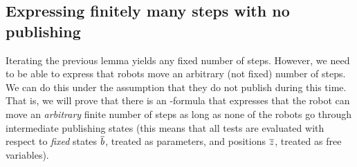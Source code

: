% 
% 
% 
% 
% 

\subsection{Expressing finitely many steps with no publishing}

Iterating the previous lemma yields any fixed number of steps. However, we need to be able to express that robots move an arbitrary (not fixed) number of steps. We can do this under the assumption that they do not publish during this time. That is, we will prove that there is an \msol-formula that expresses that the robot can move an \emph{arbitrary} finite number of steps as long as none of the robots go through intermediate publishing states (this means that all tests are evaluated with respect to \emph{fixed} states $\overline{b}$, treated as parameters, and positions $\overline{z}$, treated as free variables).


